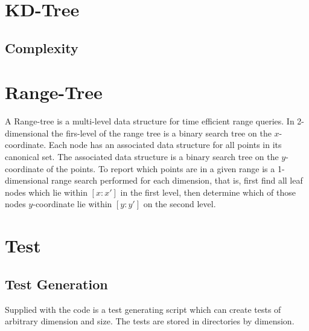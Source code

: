 \documentclass{article}
\begin{document}
\section{KD-Tree}
\subsection{Complexity}
\section{Range-Tree}
  A Range-tree is a multi-level data structure for time efficient range queries.
  In 2-dimensional the firs-level of the range tree is a binary search tree on 
  the $x$-coordinate. Each node has an associated data structure for all
  points in its canonical set. The associated data structure is a binary 
  search tree on the $y$-coordinate of the points. 
  To report which points are in a given range is a 1-dimensional range search 
  performed for each dimension, that is, first find all leaf nodes which lie 
  within $[x:x']$ in the first level, then determine which of those nodes 
  $y$-coordinate lie within $[y:y']$ on the second level. 
 \section{Test}
    \subsection{Test Generation}
    Supplied with the code is a test generating script which can create tests of
    arbitrary dimension and size. The tests are stored in directories by 
    dimension.
    
\end{document}
